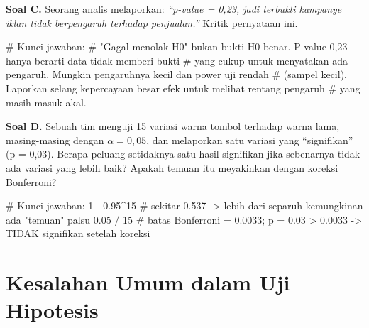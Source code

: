 \documentclass[
  indonesian,
  letterpaper,
]{book}
\newenvironment{Shaded}{\begin{snugshade}}{\end{snugshade}}
\newcommand{\CommentTok}[1]{\textcolor[rgb]{0.37,0.37,0.37}{#1}}
\newcommand{\DecValTok}[1]{\textcolor[rgb]{0.68,0.00,0.00}{#1}}
\newcommand{\FloatTok}[1]{\textcolor[rgb]{0.68,0.00,0.00}{#1}}
\newcommand{\SpecialCharTok}[1]{\textcolor[rgb]{0.37,0.37,0.37}{#1}}
\begin{document}
\textbf{Soal C.} Seorang analis melaporkan: \emph{``p-value = 0,23, jadi
terbukti kampanye iklan tidak berpengaruh terhadap penjualan.''} Kritik
pernyataan ini.

\begin{Shaded}
\begin{Highlighting}[]
\CommentTok{\# Kunci jawaban:}
\CommentTok{\# "Gagal menolak H0" bukan bukti H0 benar. P{-}value 0,23 hanya berarti data tidak memberi bukti}
\CommentTok{\# yang cukup untuk menyatakan ada pengaruh. Mungkin pengaruhnya kecil dan power uji rendah}
\CommentTok{\# (sampel kecil). Laporkan selang kepercayaan besar efek untuk melihat rentang pengaruh}
\CommentTok{\# yang masih masuk akal.}
\end{Highlighting}
\end{Shaded}

\textbf{Soal D.} Sebuah tim menguji 15 variasi warna tombol terhadap
warna lama, masing-masing dengan \(\alpha = 0{,}05\), dan melaporkan
satu variasi yang ``signifikan'' (p = 0,03). Berapa peluang setidaknya
satu hasil signifikan jika sebenarnya tidak ada variasi yang lebih baik?
Apakah temuan itu meyakinkan dengan koreksi Bonferroni?

\begin{Shaded}
\begin{Highlighting}[]
\CommentTok{\# Kunci jawaban:}
\DecValTok{1} \SpecialCharTok{{-}} \FloatTok{0.95}\SpecialCharTok{\^{}}\DecValTok{15}   \CommentTok{\# sekitar 0.537 {-}\textgreater{} lebih dari separuh kemungkinan ada "temuan" palsu}
\FloatTok{0.05} \SpecialCharTok{/} \DecValTok{15}     \CommentTok{\# batas Bonferroni = 0.0033; p = 0.03 \textgreater{} 0.0033 {-}\textgreater{} TIDAK signifikan setelah koreksi}
\end{Highlighting}
\end{Shaded}


\chapter{Kesalahan Umum dalam Uji
Hipotesis}\label{kesalahan-umum-dalam-uji-hipotesis}
\end{document}
